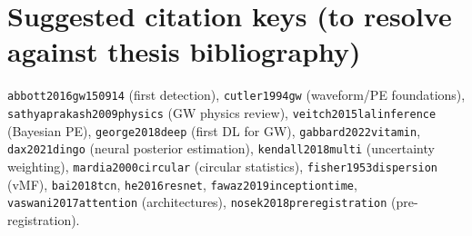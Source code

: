 \section*{Suggested citation keys (to resolve against thesis bibliography)}

\texttt{abbott2016gw150914} (first detection), \texttt{cutler1994gw} (waveform/PE foundations), \texttt{sathyaprakash2009physics} (GW physics review), \texttt{veitch2015lalinference} (Bayesian PE), \texttt{george2018deep} (first DL for GW), \texttt{gabbard2022vitamin}, \texttt{dax2021dingo} (neural posterior estimation), \texttt{kendall2018multi} (uncertainty weighting), \texttt{mardia2000circular} (circular statistics), \texttt{fisher1953dispersion} (vMF), \texttt{bai2018tcn}, \texttt{he2016resnet}, \texttt{fawaz2019inceptiontime}, \texttt{vaswani2017attention} (architectures), \texttt{nosek2018preregistration} (pre-registration).

